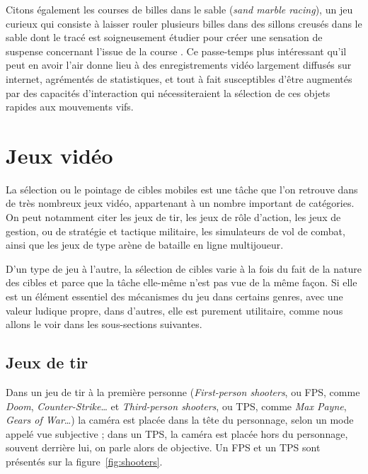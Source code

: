 	
	Citons également les courses de billes dans le sable (\emph{sand marble racing}), un jeu curieux qui consiste à laisser rouler plusieurs billes dans des sillons creusés dans le sable dont le tracé est soigneusement étudier pour créer une sensation de suspense concernant l'issue de la \og course \fg{}. Ce passe-temps plus intéressant qu'il peut en avoir l'air donne lieu à des enregistrements vidéo largement diffusés sur internet\footnotemark{}, agrémentés de statistiques, et tout à fait susceptibles d'être augmentés par des capacités d'interaction qui nécessiteraient la sélection de ces objets rapides aux mouvements vifs.
	

	\FloatBarrier	
	\section{Jeux vidéo}
	La sélection ou le pointage de cibles mobiles est une tâche que l'on retrouve dans de très nombreux jeux vidéo, appartenant à un nombre important de catégories. On peut notamment citer les jeux de tir, les jeux de rôle d'action, les jeux de gestion, ou de stratégie et tactique militaire, les simulateurs de vol de combat, ainsi que les jeux de type arène de bataille en ligne multijoueur.
	
	D'un type de jeu à l'autre, la sélection de cibles varie à la fois du fait de la nature des cibles et parce que la tâche elle-même n'est pas vue de la même façon. Si elle est un élément essentiel des mécanismes du jeu dans certains genres, avec une valeur ludique propre, dans d'autres, elle est purement utilitaire, comme nous allons le voir dans les sous-sections suivantes.
	
	\subsection{Jeux de tir}
	Dans un jeu de tir à la première personne (\emph{First-person shooters}, ou FPS, comme \emph{Doom}, \emph{Counter-Strike}\ldots{} et \emph{Third-person shooters}, ou TPS, comme \emph{Max Payne}, \emph{Gears of War}\ldots{}) la caméra est placée \og dans la tête \fg{} du personnage, selon un mode appelé vue subjective ; dans un TPS, la caméra est placée hors du personnage, souvent derrière lui, on parle alors de objective. Un FPS et un TPS sont présentés sur la figure~\ref{fig:shooters}.
	
